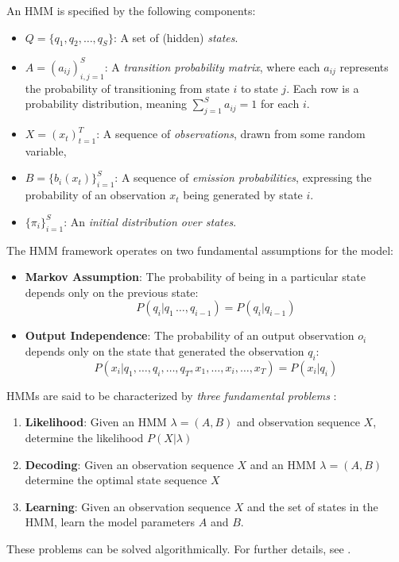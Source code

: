 An HMM is specified by the following components: \begin{itemize}
	\item $Q=\{q_1,q_2,\ldots, q_S\}$: A set of (hidden) \emph{states}.
	\item $A=(a_{ij})_{i,j=1}^S$: A \emph{transition probability matrix}, where each $a_{ij}$ represents the probability of transitioning from state $i$ to state $j$. Each row is a probability distribution, meaning $\sum_{j=1}^S a_{ij}=1$ for each $i$.
	\item $X=(x_t)_{t=1}^T$: A sequence of \emph{observations}, drawn from some random variable,
	\item $B=\{b_i(x_t)\}_{i=1}^S$: A sequence of \emph{emission probabilities}, expressing the probability of an observation $x_t$ being generated by state $i$.
	\item $\{\pi_i\}_{i=1}^S$: An \emph{initial distribution over states}.
\end{itemize}

The HMM framework operates on two fundamental assumptions for the model: \begin{itemize}
	\item {\bf Markov Assumption}: The probability of being in a particular state depends only on the previous state: \[P\left(q_i|q_1\,\ldots,q_{i-1}\right) = P(q_i|q_{i-1})\]
	\item {\bf Output Independence}: The probability of an output observation $o_i$ depends only on the state that generated the observation $q_i$: \[P\left(x_i|q_1,\ldots,q_i,\ldots,q_T,x_1,\ldots,x_i,\ldots, x_T\right)=P(x_i|q_i)\]
\end{itemize}

HMMs are said to be characterized by \emph{three fundamental problems} \cite[p. 213]{Jurafsky2009}: \begin{enumerate}
	\item {\bf Likelihood}: Given an HMM $\lambda = (A, B)$ and observation sequence $X$, determine the likelihood $P(X|\lambda)$
	\item {\bf Decoding}: Given an observation sequence $X$ and an HMM $\lambda=(A, B)$ determine the optimal state sequence $X$
	\item {\bf Learning}: Given an observation sequence $X$ and the set of states in the HMM, learn the model parameters $A$ and $B$.
\end{enumerate}

These problems can be solved algorithmically. For further details, see \cite[p. 213--226]{Jurafsky2009}.

